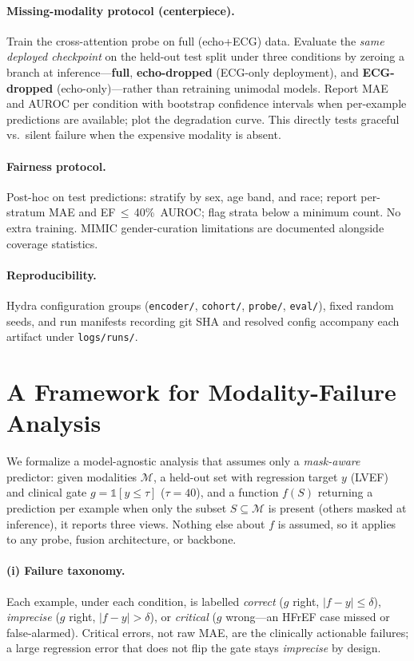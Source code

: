 \documentclass{article}
\begin{document}
\paragraph{Missing-modality protocol (centerpiece).} Train the cross-attention probe on full
(echo+ECG) data. Evaluate the \emph{same deployed checkpoint} on the held-out test split under
three conditions by zeroing a branch at inference---\textbf{full}, \textbf{echo-dropped}
(ECG-only deployment), and \textbf{ECG-dropped} (echo-only)---rather than retraining unimodal
models. Report MAE and AUROC per condition with bootstrap confidence intervals when per-example predictions are available; plot the
degradation curve. This directly tests graceful vs.\ silent failure when the expensive modality
is absent.

\paragraph{Fairness protocol.} Post-hoc on test predictions: stratify by sex, age band, and
race; report per-stratum MAE and \mbox{EF\,$\leq$\,40\% AUROC}; flag strata below a minimum
count. No extra training. MIMIC gender-curation limitations are documented alongside coverage
statistics.

\paragraph{Reproducibility.} Hydra configuration groups (\texttt{encoder/}, \texttt{cohort/},
\texttt{probe/}, \texttt{eval/}), fixed random seeds, and run manifests recording git SHA and
resolved config accompany each artifact under \texttt{logs/runs/}.

\section{A Framework for Modality-Failure Analysis}
\label{sec:framework}
We formalize a model-agnostic analysis that assumes only a \emph{mask-aware} predictor: given
modalities $\mathcal{M}$, a held-out set with regression target $y$ (LVEF) and clinical gate
$g=\mathbb{1}[y\le\tau]$ ($\tau{=}40$), and a function $f(S)$ returning a prediction per example
when only the subset $S\subseteq\mathcal{M}$ is present (others masked at inference), it reports
three views. Nothing else about $f$ is assumed, so it applies to any probe, fusion architecture, or
backbone.

\paragraph{(i) Failure taxonomy.} Each example, under each condition, is labelled \emph{correct}
($g$ right, $|f-y|\le\delta$), \emph{imprecise} ($g$ right, $|f-y|>\delta$), or \emph{critical}
($g$ wrong---an HFrEF case missed or false-alarmed). Critical errors, not raw MAE, are the
clinically actionable failures; a large regression error that does not flip the gate stays
\emph{imprecise} by design.
\end{document}
